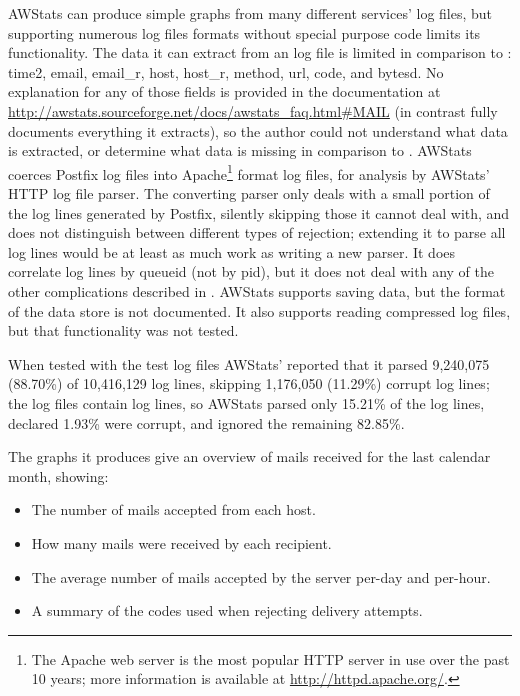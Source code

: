 AWStats can produce simple graphs from many different services' log files,
but supporting numerous log files formats without special purpose code
limits its functionality.  The data it can extract from an 
log file is limited in comparison to \parsername{}: time2, email, email\_r,
host, host\_r, method, url, code, and bytesd.  No explanation for any of
those fields is provided in the documentation at
\url{http://awstats.sourceforge.net/docs/awstats_faq.html#MAIL} (in
contrast \parsername{} fully documents everything it extracts), so the
author could not understand what data is extracted, or determine what data
is missing in comparison to \parsername{}.  AWStats coerces Postfix log
files into Apache\footnote{The Apache web server is the most popular HTTP
server in use over the past 10 years; more information is available at
\url{http://httpd.apache.org/}.} format log files, for analysis by AWStats'
HTTP log file parser.  The converting parser only deals with a small
portion of the log lines generated by Postfix, silently skipping those it
cannot deal with, and does not distinguish between different types of
rejection; extending it to parse all log lines would be at least as much
work as writing a new parser.  It does correlate log lines by queueid (not
by pid), but it does not deal with any of the other complications described
in .  AWStats supports saving data, but the
format of the data store is not documented.  It also supports reading
compressed log files, but that functionality was not tested.

When tested with the \numberOFlogFILES{} test log files AWStats' reported
that it parsed 9,240,075 (88.70\%) of 10,416,129 log lines, skipping
1,176,050 (11.29\%) corrupt log lines; the \numberOFlogFILES{} log files
contain \numberOFlogLINES{} log lines, so AWStats parsed only 15.21\% of
the log lines, declared 1.93\% were corrupt, and ignored the remaining
82.85\%.

The graphs it produces give an overview of mails received for the last
calendar month, showing:

\begin{itemize}

    \item The number of mails accepted from each host.

    \item How many mails were received by each recipient.

    \item The average number of mails accepted by the server per-day and
        per-hour.

    \item A summary of the  codes used when rejecting
        delivery attempts.

\end{itemize}

